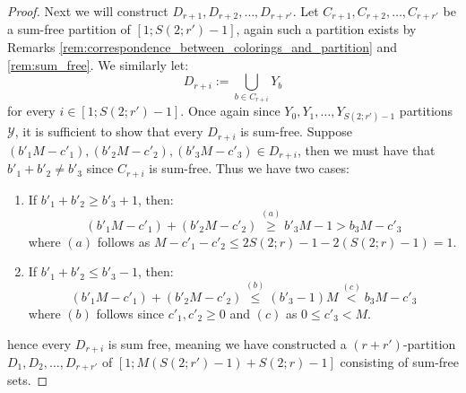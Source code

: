 \begin{proof}
	Next we will construct $D_{r + 1}, D_{r + 2}, \ldots, D_{r + r'}$. Let $C_{r + 1}, C_{r + 2}, \ldots, C_{r + r'}$ be a sum-free partition of $[1; S(2; r') - 1]$, again such a partition exists by Remarks \ref{rem:correspondence_between_colorings_and_partition} and \ref{rem:sum_free}. We similarly let:
	\begin{equation*}
		D_{r + i} := \bigcup_{b \in C_{r + i}} Y_{b}
	\end{equation*}
	for every $i \in [1; S(2; r') - 1]$. Once again since $Y_0, Y_1, \ldots, Y_{S(2; r') - 1}$ partitions $\mathcal{Y}$, it is sufficient to show that every $D_{r + i}$ is sum-free. Suppose $(b'_1 M - c'_1), (b'_2 M - c'_2), (b'_3M - c'_3) \in D_{r + i}$, then we must have that $b'_1 + b'_2 \neq b'_3$ since $C_{r + i}$ is sum-free. Thus we have two cases:
	\begin{enumerate}
		\item If $b'_1 + b'_2 \geq b'_3 + 1$, then:
		      \begin{equation*}
			      (b'_1 M - c'_1) + (b'_2 M - c'_2) \stackrel{(a)}{\geq} b'_3 M - 1 > b_3 M - c'_3
		      \end{equation*}
		      where $(a)$ follows as $M - c'_1 - c'_2 \leq 2S(2;  r) - 1 - 2(S(2; r) - 1) = 1$.
		\item If $b'_1 + b'_2 \leq b'_3 - 1$, then:
		      \begin{equation*}
			      (b'_1 M - c'_1) + (b'_2 M - c'_2) \stackrel{(b)}{\leq} (b'_3 - 1) M \stackrel{(c)}{<} b_3 M - c'_3
		      \end{equation*}
		      where $(b)$ follows since $c'_1, c'_2 \geq 0$ and $(c)$ as $0 \leq c'_3 < M$.
	\end{enumerate}
	hence every $D_{r + i}$ is sum free, meaning we have constructed a $(r + r')$-partition
	$D_1, D_2, \ldots, D_{r + r'}$ of $[1; M(S(2; r') - 1) + S(2; r) - 1]$ consisting of sum-free sets.

\end{proof}
